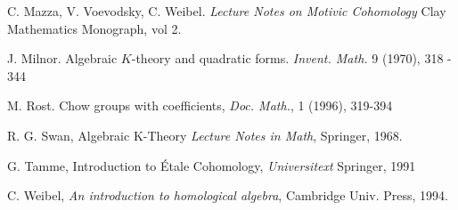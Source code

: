 \begin{thebibliography}{10}
C. Mazza, V. Voevodsky, C. Weibel.
{\em Lecture Notes on Motivic Cohomology}
Clay Mathematics Monograph, vol 2.

J. Milnor.
Algebraic $K$-theory and quadratic forms.
{\em Invent. Math.} 9 (1970), 318 - 344

M. Rost.
Chow groups with coefficients,
{\em Doc. Math.}, 1 (1996), 319-394

R. G. Swan,
Algebraic K-Theory
{\em Lecture Notes in Math},
Springer, 1968.

G. Tamme,
Introduction to \'Etale Cohomology,
{\em Universitext}
Springer, 1991

C. Weibel,
{\em An introduction to homological algebra},
Cambridge Univ. Press, 1994.
\end{thebibliography}
